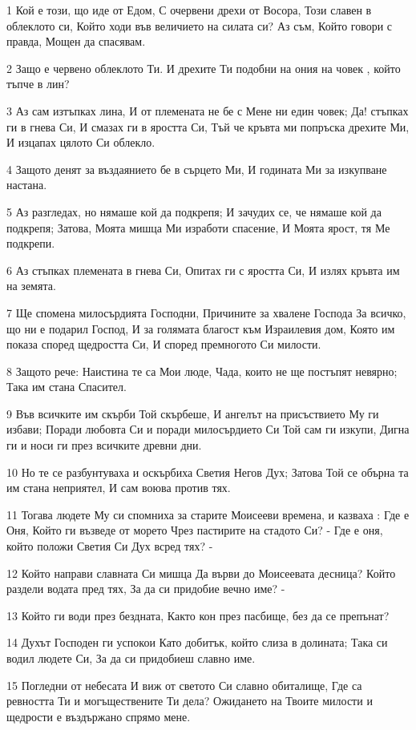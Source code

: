 \par 1 Кой е този, що иде от Едом, С очервени дрехи от Восора, Този славен в облеклото си, Който ходи във величието на силата си? Аз съм, Който говори с правда, Мощен да спасявам.
\par 2 Защо е червено облеклото Ти. И дрехите Ти подобни на ония на човек , който тъпче в лин?
\par 3 Аз сам изтъпках лина, И от племената не бе с Мене ни един човек; Да! стъпках ги в гнева Си, И смазах ги в яростта Си, Тъй че кръвта ми попръска дрехите Ми, И изцапах цялото Си облекло.
\par 4 Защото денят за въздаянието бе в сърцето Ми, И годината Ми за изкупване настана.
\par 5 Аз разгледах, но нямаше кой да подкрепя; И зачудих се, че нямаше кой да подкрепя; Затова, Моята мишца Ми изработи спасение, И Моята ярост, тя Ме подкрепи.
\par 6 Аз стъпках племената в гнева Си, Опитах ги с яростта Си, И излях кръвта им на земята.
\par 7 Ще спомена милосърдията Господни, Причините за хвалене Господа За всичко, що ни е подарил Господ, И за голямата благост към Израилевия дом, Която им показа според щедростта Си, И според премногото Си милости.
\par 8 Защото рече: Наистина те са Мои люде, Чада, които не ще постъпят невярно; Така им стана Спасител.
\par 9 Във всичките им скърби Той скърбеше, И ангелът на присъствието Му ги избави; Поради любовта Си и поради милосърдието Си Той сам ги изкупи, Дигна ги и носи ги през всичките древни дни.
\par 10 Но те се разбунтуваха и оскърбиха Светия Негов Дух; Затова Той се обърна та им стана неприятел, И сам воюва против тях.
\par 11 Тогава людете Му си спомниха за старите Моисееви времена, и казваха : Где е Оня, Който ги възведе от морето Чрез пастирите на стадото Си? - Где е оня, който положи Светия Си Дух всред тях? -
\par 12 Който направи славната Си мишца Да върви до Моисеевата десница? Който раздели водата пред тях, За да си придобие вечно име? -
\par 13 Който ги води през бездната, Както кон през пасбище, без да се препънат?
\par 14 Духът Господен ги успокои Като добитък, който слиза в долината; Така си водил людете Си, За да си придобиеш славно име.
\par 15 Погледни от небесата И виж от светото Си славно обиталище, Где са ревността Ти и могъществените Ти дела? Ожидането на Твоите милости и щедрости е въздържано спрямо мене.

